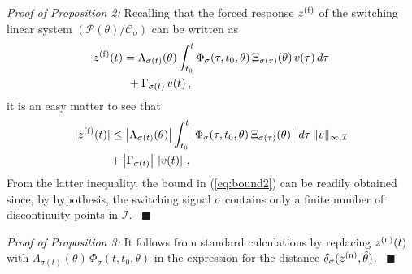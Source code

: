 \documentclass[letterpaper, 10 pt, conference]{ieeetran}
\def\qedp{\hspace*{\fill}~{\tiny $\blacksquare$}}
\begin{document}
{\em Proof of Proposition 2:}
Recalling that the forced response $z^{({\rm f})}$ of the switching linear system $(\mathcal P (\theta) / \mathcal C_\sigma)$ can be written
as
\[
\begin{split}
&z^{({\rm f})} (t) =  \Lambda_{\sigma(t)} (\theta) \int_{t_0}^{t}  \Phi_\sigma(\tau,t_0,\theta) \, \Xi_{\sigma(\tau)} (\theta) \, v(\tau) \, d \tau \\
&  \quad \quad \quad + \Gamma_{\sigma(t)} \, v (t) \, ,
\end{split}
\]
it is an easy matter to see that 
\[
\begin{split}
&|z^{({\rm f})} (t)| \le \left | \Lambda_{\sigma(t)} (\theta) \right | \int_{t_0}^{t}  \left | \Phi_\sigma(\tau,t_0,\theta) \, \Xi_{\sigma(\tau)} (\theta) \right |   \, d \tau \, \|  v \|_{\infty, \mathcal I} \\
 &\quad \quad \quad + \left | \Gamma_{\sigma(t)} \right | \, \left | v (t) \right | \, . 
 \end{split}
 \]
From the latter inequality, the bound in (\ref{eq:bound2}) can be readily obtained since, by hypothesis, the switching signal $\sigma$ contains only a finite number of discontinuity points in $\mathcal I$.
\qedp

{\em Proof of Proposition 3:} It follows from standard calculations by replacing $z^{({\rm n})} (t)$ with $ \Lambda_{\sigma (t)} (\theta) \, \Phi_\sigma (t,t_0,\theta)$ in the expression for the distance $\delta_\sigma (z^{({\rm n})}, \hat \theta)$. \qedp
\end{document}
